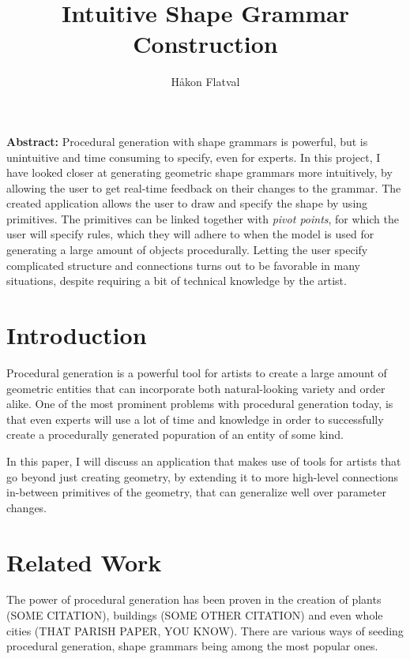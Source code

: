 \documentclass[english]{article}
\begin{document}
\title{Intuitive Shape Grammar Construction}

\author{Håkon Flatval}

\maketitle
\thispagestyle{fancy}

\begin{center}

  {\bf \Large Abstract:} Procedural generation with shape grammars is powerful, but is unintuitive and time consuming to specify, even for experts. In this project, I have looked closer at generating geometric shape grammars more intuitively, by allowing the user to get real-time feedback on their changes to the grammar. The created application allows the user to draw and specify the shape by using primitives. The primitives can be linked together with \textit{pivot points}, for which the user will specify rules, which they will adhere to when the model is used for generating a large amount of objects procedurally. Letting the user specify complicated structure and connections turns out to be favorable in many situations, despite requiring a bit of technical knowledge by the artist.
  
\end{center}

\section{Introduction}

Procedural generation is a powerful tool for artists to create a large amount of geometric entities that can incorporate both natural-looking variety and order alike. One of the most prominent problems with procedural generation today, is that even experts will use a lot of time and knowledge in order to successfully create a procedurally generated popuration of an entity of some kind.

In this paper, I will discuss an application that makes use of tools for artists that go beyond just creating geometry, by extending it to more high-level connections in-between primitives of the geometry, that can generalize well over parameter changes.


\section{Related Work}

The power of procedural generation has been proven in the creation of plants (SOME CITATION), buildings (SOME OTHER CITATION) and even whole cities (THAT PARISH PAPER, YOU KNOW). There are various ways of seeding procedural generation, shape grammars being among the most popular ones.
\end{document}
